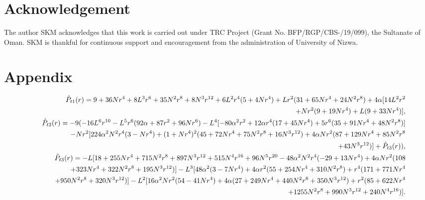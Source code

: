 \documentclass[]{aastex631}
\begin{document}
\section*{Acknowledgement}
The author SKM acknowledges that this work is carried out under TRC Project (Grant No. BFP/RGP/CBS-/19/099), the Sultanate of Oman. SKM is thankful for continuous support and encouragement from the administration of University of Nizwa. 

\section*{Appendix}
\begin{eqnarray}
&& \hspace{-0.2cm}  \hat{P}_{t1}(r)= 9 + 36 N r^4 + 8 L^3 r^6 + 35 N^2 r^8 + 8 N^3 r^{12} + 6 L^2 r^4  (5 + 4 N r^4) + L r^2 (31 + 65 N r^4 + 24 N^2 r^8) + 4 \alpha [14 L^2 r^2 \nonumber\\&& \hspace{0.9cm} + N r^2 (9 + 19 N r^4) + L (9 + 33 N r^4)],\nonumber\\
&& \hspace{-0.4cm} \hat{P}_{t2}(r)=- 9 (-16 L^6 r^{10} - L^5 r^6 (92 \alpha + 87 r^2 + 96 N r^6) - L^4 [-80 \alpha^2 r^2 + 12 \alpha r^4 (17 + 45 N r^4) +   5 r^6 (35 + 91 N r^4  + 48 N^2 r^8)] \nonumber\\&& \hspace{0.9cm} -  N r^2 [224 \alpha^2 N^2 r^4 (3-N r^4) + (1 + N r^4)^2  (45 +  72 N r^4 + 75 N^2 r^8 + 16 N^3 r^{12}) + 4 \alpha N r^2 (87 + 129 N r^4 + 85 N^2 r^8 \nonumber\\&& \hspace{0.9cm} + 43 N^3 r^{12})]+\hat{P}_{t3}(r)),\nonumber \\
&& \hspace{-0.4cm} \hat{P}_{t3}(r)=-  L [18 + 255 N r^4 + 715 N^2 r^8 + 897 N^3 r^{12} + 515 N^4 r^{16} + 96 N^5 r^{20} - 48 \alpha^2 N^2 r^4 (-29 + 13 N r^4) +  4 \alpha N r^2 (108  \nonumber\\&& \hspace{0.9cm} + 323 N r^4 + 322 N^2 r^8 + 195 N^3 r^{12})] -    L^3 [48 \alpha^2 (3 - 7 N r^4) +     4 \alpha r^2 (55 + 254 N r^4 + 310 N^2 r^8) +  r^4 (171 + 771 N r^4 \nonumber\\&& \hspace{0.9cm} + 950 N^2 r^8 + 320 N^3 r^{12})] -   L^2 [16 \alpha^2 N r^2 (54 - 41 N r^4)  +  4 \alpha (27 + 249 N r^4 + 440 N^2 r^8 + 350 N^3 r^{12}) +   r^2 (85 + 622 N r^4 \nonumber\\&& \hspace{0.9cm} + 1255 N^2 r^8 + 990 N^3 r^{12} +   240 N^4 r^{16})].\nonumber \\ 

\end{eqnarray}
\end{document}
